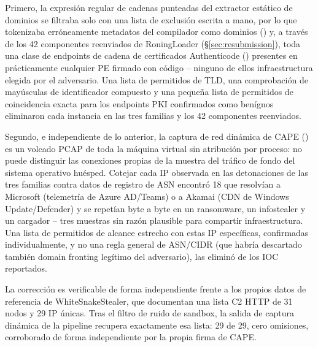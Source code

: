 Primero, la expresi\'on regular de cadenas punteadas del extractor
est\'atico de dominios se filtraba solo con una lista de exclusi\'on
escrita a mano, por lo que tokenizaba err\'oneamente metadatos del
compilador como dominios () y, a trav\'es de
los 42 componentes reenviados de RoningLoader
(\S\ref{sec:resubmission}), toda una clase de endpoints de cadena de
certificados Authenticode () presentes en
pr\'acticamente cualquier PE firmado con c\'odigo -- ninguno de ellos
infraestructura elegida por el adversario. Una lista de permitidos de
TLD, una comprobaci\'on de may\'usculas de identificador compuesto y
una peque\~na lista de permitidos de coincidencia exacta para los
endpoints PKI confirmados como ben\'ignos eliminaron cada instancia en
las tres familias y los 42 componentes reenviados.

Segundo, e independiente de lo anterior, la captura de red din\'amica
de CAPE () es un volcado PCAP de toda la m\'aquina
virtual sin atribuci\'on por proceso: no puede distinguir las
conexiones propias de la muestra del tr\'afico de fondo del sistema
operativo hu\'esped. Cotejar cada IP observada en las detonaciones de
las tres familias contra datos de registro de ASN encontr\'o 18 que
resolv\'ian a Microsoft (telemetr\'ia de Azure AD/Teams) o a Akamai
(CDN de Windows Update/Defender) y se repet\'ian byte a byte en un
ransomware, un infostealer y un cargador -- tres muestras sin raz\'on
plausible para compartir infraestructura. Una lista de permitidos de
alcance estrecho con estas IP espec\'ificas, confirmadas
individualmente, y no una regla general de ASN/CIDR (que habr\'ia
descartado tambi\'en domain fronting leg\'itimo del adversario), las
elimin\'o de los IOC reportados.

La correcci\'on es verificable de forma independiente frente a los
propios datos de referencia de WhiteSnakeStealer, que documentan una
lista C2 HTTP de 31 nodos y 29 IP \'unicas. Tras el filtro de ruido de
sandbox, la salida de captura din\'amica de la pipeline recupera
exactamente esa lista: 29 de 29, cero omisiones, corroborado de forma
independiente por la propia firma  de CAPE.

